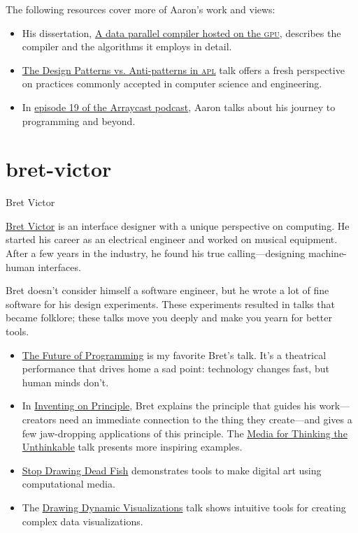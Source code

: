 \documentclass{article}
\begin{document}
The following resources cover more of Aaron's work and views:

\begin{itemize}
\item His dissertation, \href{https://scholarworks.iu.edu/dspace/items/3ab772c9-92c9-4f59-bd95-40aff99e8c7a}{A data parallel compiler hosted on the \textsc{gpu}},
  describes the compiler and the algorithms it employs in detail.
\item \href{https://youtu.be/v7Mt0GYHU9A?si=owpqFmu8fJEoLMkF}{The Design Patterns vs. Anti-patterns in \textsc{apl}} talk offers a fresh perspective on practices commonly accepted in computer science and engineering.
\item In \href{https://www.arraycast.com/episodes/episode19-aaron-hsu}{episode 19 of the Arraycast podcast}, Aaron talks about his journey to programming and beyond.
\end{itemize}

\section{bret-victor}{Bret Victor}

\href{https://worrydream.com}{Bret Victor} is an interface designer with a unique perspective on computing.
He started his career as an electrical engineer and worked on musical equipment.
After a few years in the industry, he found his true calling---designing machine-human interfaces.

Bret doesn't consider himself a software engineer, but he wrote a lot of fine software for his design experiments.
These experiments resulted in talks that became folklore; these talks move you deeply and make you yearn for better tools.

\begin{itemize}
\item \href{https://youtu.be/8pTEmbeENF4?si=qe385Fdh_NDQTvdA}{The Future of Programming} is my favorite Bret's talk.
  It's a theatrical performance that drives home a sad point: technology changes fast, but human minds don't.
\item In \href{https://youtu.be/PUv66718DII?si=blwP72mJuUfeMYCU}{Inventing on Principle}, Bret explains the principle that guides his work---creators need an immediate connection to the thing they create---and gives a few jaw-dropping applications of this principle.
  The \href{https://youtu.be/oUaOucZRlmE?si=jHKxVhtmQ1JLrTMR}{Media for Thinking the Unthinkable} talk presents more inspiring examples.
\item \href{https://youtu.be/ZfytHvgHybA?si=ouk9qok4m87bVUto}{Stop Drawing Dead Fish} demonstrates tools to make digital art using computational media.
\item The \href{https://youtu.be/ef2jpjTEB5U?si=iLrCtZCDiForNSj5}{Drawing Dynamic Visualizations} talk shows intuitive tools for creating complex data visualizations.
\end{itemize}
\end{document}
